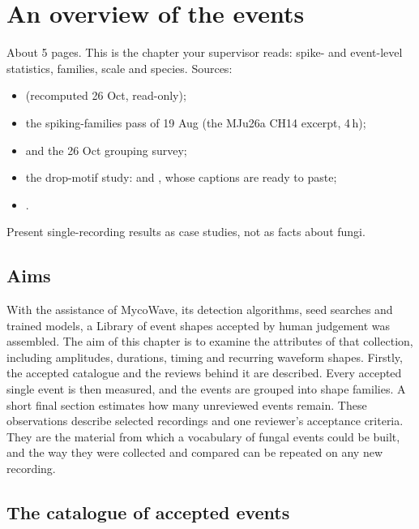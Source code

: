 \chapter{An overview of the events}
\label{ch:events}

\begin{instructions}
About 5 pages. This is the chapter your supervisor reads: spike- and event-level statistics, families, scale and
species. Sources:
\begin{itemize}
  \item {} (recomputed 26 Oct, read-only);
  \item the spiking-families pass of 19 Aug (the MJu26a CH14 excerpt, 4\,h);
  \item {} and the 26 Oct grouping survey;
  \item the drop-motif study:  and , whose
        captions are ready to paste;
  \item {}.
\end{itemize}
Present single-recording results as case studies, not as facts about fungi.
\end{instructions}

\section{Aims}

With the assistance of MycoWave, its detection algorithms, seed searches and trained models, a Library of event shapes accepted by human judgement was assembled. The aim of this chapter is to examine the attributes of that collection, including amplitudes, durations, timing and recurring waveform shapes. Firstly, the accepted catalogue and the reviews behind it are described. Every accepted single event is then measured, and the events are grouped into shape families. A short final section estimates how many unreviewed events remain. These observations describe selected recordings and one reviewer's acceptance criteria. They are the material from which a vocabulary of fungal events could be built, and the way they were collected and compared can be repeated on any new recording.

\section{The catalogue of accepted events}
\label{sec:catalogue}


